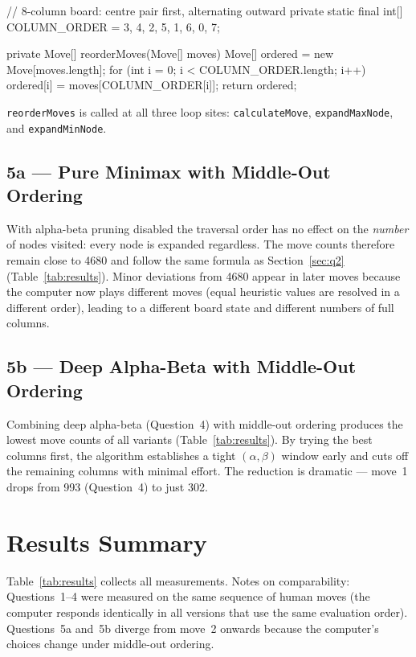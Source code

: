 \documentclass[language=english,titlepage=false,smartquotes=true]{hgbreport}
\begin{document}
\begin{JavaCode}[numbers=none]
// 8-column board: centre pair first, alternating outward
private static final int[] COLUMN_ORDER = {3, 4, 2, 5, 1, 6, 0, 7};

private Move[] reorderMoves(Move[] moves) {
    Move[] ordered = new Move[moves.length];
    for (int i = 0; i < COLUMN_ORDER.length; i++) {
        ordered[i] = moves[COLUMN_ORDER[i]];
    }
    return ordered;
}
\end{JavaCode}

\texttt{reorderMoves} is called at all three loop sites:
\texttt{calculateMove}, \texttt{expandMaxNode}, and \texttt{expandMinNode}.

\subsection{5a --- Pure Minimax with Middle-Out Ordering}

With alpha-beta pruning disabled the traversal order has no effect on the
\emph{number} of nodes visited: every node is expanded regardless. The move
counts therefore remain close to 4680 and follow the same formula as
Section~\ref{sec:q2} (Table~\ref{tab:results}). Minor deviations from 4680
appear in later moves because the computer now plays different moves (equal
heuristic values are resolved in a different order), leading to a different
board state and different numbers of full columns.

\subsection{5b --- Deep Alpha-Beta with Middle-Out Ordering}

Combining deep alpha-beta (Question~4) with middle-out ordering produces the
lowest move counts of all variants (Table~\ref{tab:results}). By trying the
best columns first, the algorithm establishes a tight $(\alpha, \beta)$ window
early and cuts off the remaining columns with minimal effort. The reduction
is dramatic --- move~1 drops from 993 (Question~4) to just 302.

\section*{Results Summary}

Table~\ref{tab:results} collects all measurements. Notes on comparability:
Questions~1--4 were measured on the same sequence of human moves (the computer
responds identically in all versions that use the same evaluation order).
Questions~5a and~5b diverge from move~2 onwards because the computer's choices
change under middle-out ordering.
\end{document}
